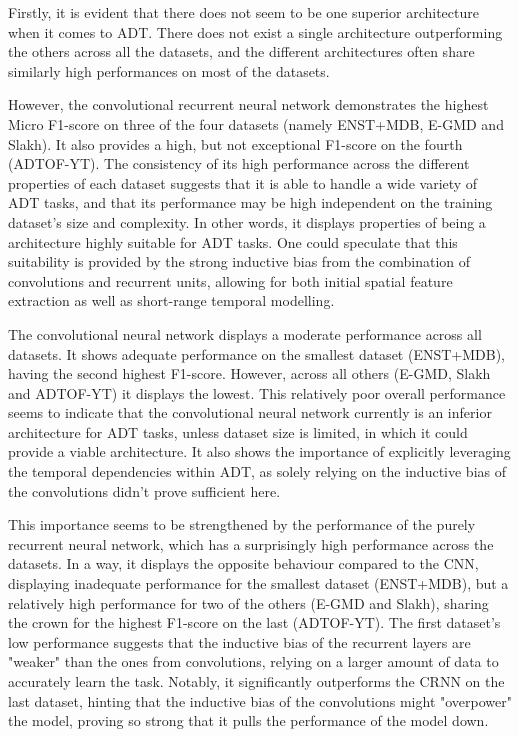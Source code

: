 Firstly, it is evident that there does not seem to be one superior architecture when it comes to \gls{ADT}. There does not exist a single architecture outperforming the others across all the datasets, and the different architectures often share similarly high performances on most of the datasets. 

However, the convolutional recurrent neural network demonstrates the highest Micro F1-score on three of the four datasets (namely ENST+MDB, E-GMD and Slakh). It also provides a high, but not exceptional F1-score on the fourth (ADTOF-YT). The consistency of its high performance across the different properties of each dataset suggests that it is able to handle a wide variety of \gls{ADT} tasks, and that its performance may be high independent on the training dataset's size and complexity. In other words, it displays properties of being a architecture highly suitable for \gls{ADT} tasks. One could speculate that this suitability is provided by the strong inductive bias from the combination of convolutions and recurrent units, allowing for both initial spatial feature extraction as well as short-range temporal modelling.

The convolutional neural network displays a moderate performance across all datasets. It shows adequate performance on the smallest dataset (ENST+MDB), having the second highest F1-score. However, across all others (E-GMD, Slakh and ADTOF-YT) it displays the lowest. This relatively poor overall performance seems to indicate that the convolutional neural network currently is an inferior architecture for \gls{ADT} tasks, unless dataset size is limited, in which it could provide a viable architecture. It also shows the importance of explicitly leveraging the temporal dependencies within \gls{ADT}, as solely relying on the inductive bias of the convolutions didn't prove sufficient here.

This importance seems to be strengthened by the performance of the purely recurrent neural network, which has a surprisingly high performance across the datasets. In a way, it displays the opposite behaviour compared to the \gls{CNN}, displaying inadequate performance for the smallest dataset (ENST+MDB), but a relatively high performance for two of the others (E-GMD and Slakh), sharing the crown for the highest F1-score on the last (ADTOF-YT). The first dataset's low performance suggests that the inductive bias of the recurrent layers are "weaker" than the ones from convolutions, relying on a larger amount of data to accurately learn the task. Notably, it significantly outperforms the \gls{CRNN} on the last dataset, hinting that the inductive bias of the convolutions might "overpower" the model, proving so strong that it pulls the performance of the model down.

